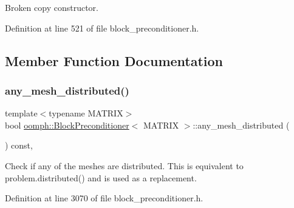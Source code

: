 Broken copy constructor. 



Definition at line 521 of file block\+\_\+preconditioner.\+h.



\subsection{Member Function Documentation}
\mbox{\label{classoomph_1_1BlockPreconditioner_a6fb68db9e79048615984b005f8aa43b3}} 
\subsubsection{\texorpdfstring{any\+\_\+mesh\+\_\+distributed()}{any\_mesh\_distributed()}}
{\footnotesize\ttfamily template$<$typename M\+A\+T\+R\+IX$>$ \\
bool \hyperlink{classoomph_1_1BlockPreconditioner}{oomph\+::\+Block\+Preconditioner}$<$ M\+A\+T\+R\+IX $>$\+::any\+\_\+mesh\+\_\+distributed (\begin{DoxyParamCaption}{ }\end{DoxyParamCaption}) const\hspace{0.3cm}{\ttfamily [inline]}, {\ttfamily [protected]}}



Check if any of the meshes are distributed. This is equivalent to problem.\+distributed() and is used as a replacement. 



Definition at line 3070 of file block\+\_\+preconditioner.\+h.

\mbox{\label{classoomph_1_1BlockPreconditioner_a77ac0b71404620e7be8b15ac2d588495}} 
